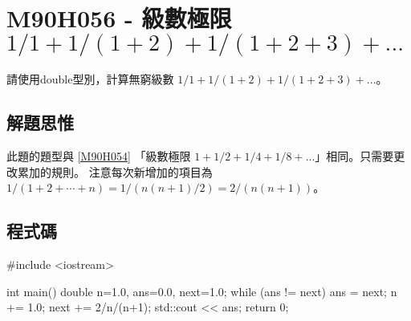 \section{M90H056 - 級數極限 $1/1+1/(1+2)+1/(1+2+3)+...$}
請使用double型別，計算無窮級數 $1/1+1/(1+2)+1/(1+2+3)+...$。 

\subsection{解題思惟}
此題的題型與
\ref{M90H054}
「級數極限 $1+1/2+1/4+1/8+...$」相同。只需要更改累加的規則。
注意每次新增加的項目為 $1/(1+2+\cdots+n) = 1/(n(n+1)/2) = 2/(n(n+1))$。


\subsection{程式碼}
\begin{cppcode}
#include <iostream>

int main()
{
	double n=1.0, ans=0.0, next=1.0;
	while (ans != next) {
		ans = next;
		n += 1.0;
		next += 2/n/(n+1); 
	}
	std::cout << ans;
	return 0;
}
\end{cppcode}
